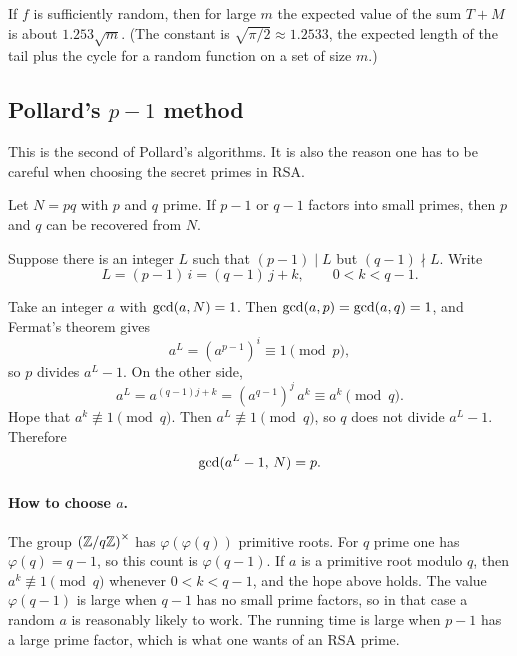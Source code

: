 \begin{remark}
If $f$ is sufficiently random, then for large $m$ the expected value of the sum $T+M$ is about $1.253\sqrt{m}$. (The constant is $\sqrt{\pi/2}\approx 1.2533$, the expected length of the tail plus the cycle for a random function on a set of size $m$.)
\end{remark}

\subsection{Pollard's \texorpdfstring{$p-1$}{p-1} method}

This is the second of Pollard's algorithms. It is also the reason one has to be careful when choosing the secret primes in RSA.

Let $N=pq$ with $p$ and $q$ prime. If $p-1$ or $q-1$ factors into small primes, then $p$ and $q$ can be recovered from $N$.

Suppose there is an integer $L$ such that $(p-1)\mid L$ but $(q-1)\nmid L$. Write
\[
    L=(p-1)\,i
    = (q-1)\,j + k,
    \qquad 0<k<q-1.
\]


Take an integer $a$ with $\operatorname{gcd}(a,N)=1$. Then $\operatorname{gcd}(a,p)=\operatorname{gcd}(a,q)=1$, and Fermat's theorem gives
\[
    a^{L}=(a^{p-1})^{i}\equiv 1\pmod{p},
\]
so $p$ divides $a^{L}-1$. On the other side,
\[
    a^{L}=a^{(q-1)j+k}=(a^{q-1})^{j}\,a^{k}\equiv a^{k}\pmod{q}.
\]
Hope that $a^{k}\not\equiv 1\pmod{q}$. Then $a^{L}\not\equiv 1\pmod{q}$, so $q$ does not divide $a^{L}-1$. Therefore
\[
    \operatorname{gcd}(a^{L}-1,\, N)=p.
\]

\paragraph{How to choose $a$.}
The group $\left(\mathbb Z/q\mathbb Z\right)^\times$ has $\varphi(\varphi(q))$ primitive roots. For $q$ prime one has $\varphi(q)=q-1$, so this count is $\varphi(q-1)$. If $a$ is a primitive root modulo $q$, then $a^{k}\not\equiv 1\pmod{q}$ whenever $0<k<q-1$, and the hope above holds. The value $\varphi(q-1)$ is large when $q-1$ has no small prime factors, so in that case a random $a$ is reasonably likely to work. The running time is large when $p-1$ has a large prime factor, which is what one wants of an RSA prime.

